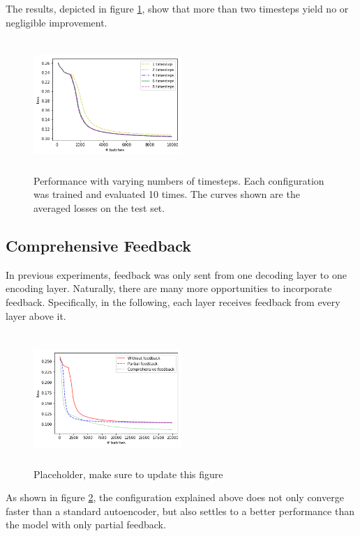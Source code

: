 \documentclass{article}
\begin{document}
The results, depicted in figure \ref{fig:timesteps}, show that more than two timesteps yield no or negligible improvement. 


\begin{figure}
      \centering
      \includegraphics[width=0.5\textwidth,height=5cm,keepaspectratio]{img/timesteps_test.png}
      \caption{Performance with varying numbers of timesteps. Each configuration was trained and evaluated 10 times. The curves shown are the averaged losses on the test set.}
      \label{fig:timesteps}
  \end{figure}
 
 
\subsection{Comprehensive Feedback}
In previous experiments, feedback was only sent from one decoding layer to one encoding layer. Naturally, there are many more opportunities to incorporate feedback. Specifically, in the following, each layer receives feedback from every layer above it.

  \begin{figure}[H]
      \centering
      \includegraphics[width=0.5\textwidth,height=5cm,keepaspectratio]{img/fullfb.png}
      \caption{Placeholder, make sure to update this figure}
      \label{fig:fullfeedback}
  \end{figure}
  
  As shown in figure \ref{fig:fullfeedback}, the configuration explained above does not only converge faster than a standard autoencoder, but also settles to a better performance than the model with only partial feedback. 
    
\end{document}

